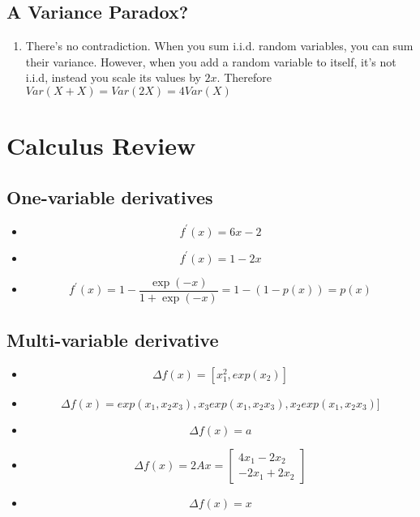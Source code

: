 \documentclass{article}
\begin{document}
\subsection{A Variance Paradox?}
\begin{enumerate}
    \item There's no contradiction. When you sum i.i.d. random variables, you can sum their variance. However, when you add a random variable to itself, it's not i.i.d, instead you scale its values by $2x$. Therefore $Var(X + X) = Var(2X) = 4Var(X)$
\end{enumerate}

\section{Calculus Review }
\subsection{One-variable derivatives}
\begin{itemize}
    \item 
    \[
        f^{'}(x) = 6x-2
    \]
    \item 
    \[
        f^{'}(x) = 1 - 2x
    \]
    \item 
    \[
        f^{'}(x) = 1 - \frac{\exp(-x)}{1+\exp(-x)} = 1 - (1-p(x)) = p(x)
    \]
\end{itemize}

\subsection{Multi-variable derivative}
\begin{itemize}
    \item 
    \[
        \Delta f(x) = [x_1^2, exp(x_2)]
    \]
    \item 
    \[
        \Delta f(x) = exp(x_1, x_2 x_3), x_3 exp(x_1, x_2 x_3), x_2 exp(x_1, x_2 x_3)]
    \]
    \item 
    \[
        \Delta f(x) = a
    \]
    \item 
    \[\Delta f(x) = 2Ax =
        \begin{bmatrix}
             4x_1 - 2x_2 \\
            -2x_1 + 2x_2
        \end{bmatrix}
    \]
    \item 
    \[ 
        \Delta f(x) = x 
    \]
\end{itemize}
\end{document}

